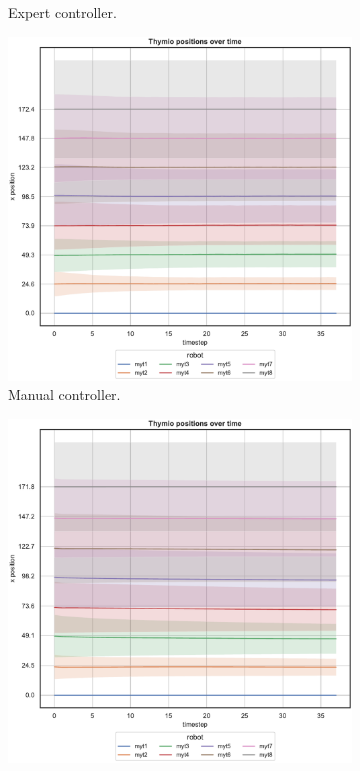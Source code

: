 \begin{figure}[!htb]
\begin{center}
\begin{subfigure}[h]{0.325\textwidth}
			\caption{Expert controller.}
		\end{subfigure}
		\hfill
		\begin{subfigure}[h]{0.325\textwidth}
			\centering
			\includegraphics[width=\textwidth]{contents/images/net-d18/N8/position-overtime-manual}%
			\caption{Manual controller.}
		\end{subfigure}
		\hfill
		\begin{subfigure}[h]{0.325\textwidth}
			\centering
			\includegraphics[width=\textwidth]{contents/images/net-d18/N8/position-overtime-distributed}

\end{subfigure}
\end{center}
\end{figure}
